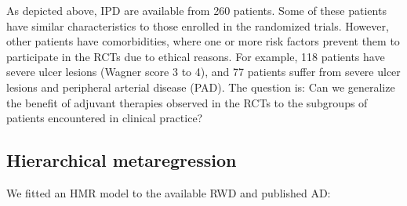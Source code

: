 \documentclass[
  letterpaper,
  DIV=11,
  numbers=noendperiod]{scrreprt}
\begin{document}
As depicted above, IPD are available from 260 patients. Some of these
patients have similar characteristics to those enrolled in the
randomized trials. However, other patients have comorbidities, where one
or more risk factors prevent them to participate in the RCTs due to
ethical reasons. For example, 118 patients have severe ulcer lesions
(Wagner score 3 to 4), and 77 patients suffer from severe ulcer lesions
and peripheral arterial disease (PAD). The question is: Can we
generalize the benefit of adjuvant therapies observed in the RCTs to the
subgroups of patients encountered in clinical practice?

\hypertarget{hierarchical-metaregression}{%
\subsection{Hierarchical
metaregression}\label{hierarchical-metaregression}}

We fitted an HMR model to the available RWD and published AD:
\end{document}
